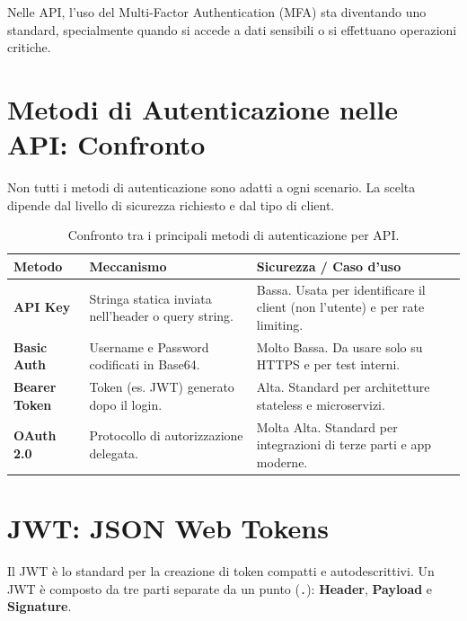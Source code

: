\documentclass[11pt,a4paper]{report}
\begin{document}
Nelle API, l'uso del Multi-Factor Authentication (MFA) sta diventando uno standard, specialmente quando si accede a dati sensibili o si effettuano operazioni critiche.

\section{Metodi di Autenticazione nelle API: Confronto}
Non tutti i metodi di autenticazione sono adatti a ogni scenario. La scelta dipende dal livello di sicurezza richiesto e dal tipo di client.

\begin{table}[ht]
\centering
\begin{tabular}{lp{4cm}p{5cm}}
\toprule
\textbf{Metodo} & \textbf{Meccanismo} & \textbf{Sicurezza / Caso d'uso} \\
\midrule
\textbf{API Key} & Stringa statica inviata nell'header o query string. & Bassa. Usata per identificare il client (non l'utente) e per rate limiting. \\
\textbf{Basic Auth} & Username e Password codificati in Base64. & Molto Bassa. Da usare solo su HTTPS e per test interni. \\
\textbf{Bearer Token} & Token (es. JWT) generato dopo il login. & Alta. Standard per architetture stateless e microservizi. \\
\textbf{OAuth 2.0} & Protocollo di autorizzazione delegata. & Molta Alta. Standard per integrazioni di terze parti e app moderne. \\
\bottomrule
\end{tabular}
\caption{Confronto tra i principali metodi di autenticazione per API.}
\label{tab:auth_methods}
\end{table}

\section{JWT: JSON Web Tokens}
Il JWT è lo standard per la creazione di token compatti e autodescrittivi. Un JWT è composto da tre parti separate da un punto (\texttt{.}): \textbf{Header}, \textbf{Payload} e \textbf{Signature}.
\end{document}
